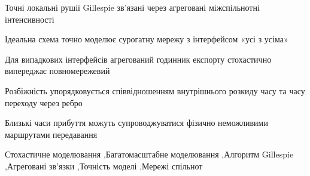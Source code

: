 \begin{highlights}
\item Точні локальні рушії Gillespie зв'язані через агреговані міжспільнотні інтенсивності
\item Ідеальна схема точно моделює сурогатну мережу з інтерфейсом «усі з усіма»
\item Для випадкових інтерфейсів агрегований годинник експорту стохастично випереджає повномережевий
\item Розбіжність упорядковується співвідношенням внутрішнього розкиду часу та часу переходу через ребро
\item Близькі часи прибуття можуть супроводжуватися фізично неможливими маршрутами передавання
\end{highlights}

\begin{keywords}
Стохастичне моделювання \sep Багатомасштабне моделювання \sep Алгоритм Gillespie \sep Агреговані зв'язки \sep Точність моделі \sep Мережі спільнот
\end{keywords}

\maketitle

\clearpage


\clearpage
